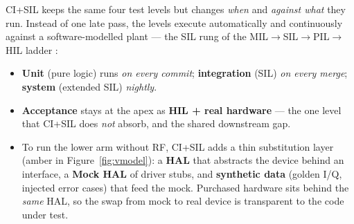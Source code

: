 \documentclass[11pt,a4paper]{article}
\begin{document}
CI+SIL keeps the same four test levels but changes \emph{when} and \emph{against what}
they run. Instead of one late pass, the levels execute automatically and continuously
against a software-modelled plant --- the SIL rung of the MIL$\to$SIL$\to$PIL$\to$HIL
ladder \cite{opalrt2026,sheridan2026a}:

\begin{itemize}[leftmargin=*,itemsep=1pt]
\item \textbf{Unit} (pure logic) runs \emph{on every commit}; \textbf{integration} (SIL)
  \emph{on every merge}; \textbf{system} (extended SIL) \emph{nightly}.
\item \textbf{Acceptance} stays at the apex as \textbf{HIL + real hardware} --- the one
  level that CI+SIL does \emph{not} absorb, and the shared downstream gap.
\item To run the lower arm without RF, CI+SIL adds a thin substitution layer (amber in
  Figure~\ref{fig:vmodel}): a \textbf{HAL} that abstracts the device behind an interface,
  a \textbf{Mock HAL} of driver stubs, and \textbf{synthetic data} (golden I/Q, injected
  error cases) that feed the mock. Purchased hardware sits behind the \emph{same} HAL,
  so the swap from mock to real device is transparent to the code under test.
\end{itemize}
\end{document}
